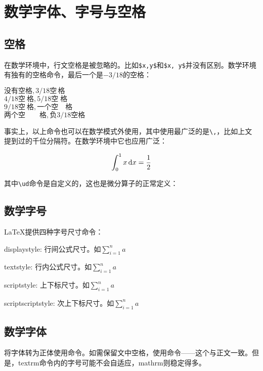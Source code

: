 {\section{数学字体、字号与空格}
\label{sec:mathfont}
\subsection{空格}
在数学环境中，行文空格是被忽略的。比如\verb|$x,y$|和\verb|$x, y$|并没有区别。数学环境有独有的空格命令，最后一个是$-3/18$的空格：

\begin{codeshow}
  $没有空格,3/18空\,格$ \\
  $4/18空\:格,5/18空\;格$ \\
  $9/18空\ 格,一个空\quad 格$ \\
  $两个空\qquad 格,负3/18空\!格$
\end{codeshow}

事实上，以上命令也可以在数学模式外使用，其中使用最广泛的是\verb|\,|，比如上文提到过的千位分隔符。在数学环境中它也应用广泛：

\begin{codeshow}
\[ \int_0^1 x \ud{}x
= \frac{1}{2} \]
\end{codeshow}

其中\verb|\ud|命令是自定义的，这也是微分算子的正常定义\label{cmd:ud}：
\begin{latex}{}
\newcommand{\ud}{\mathop{}\negthinspace\mathrm{d}}
\end{latex}

\subsection{数学字号}
\LaTeX{}提供四种字号尺寸命令：
\begin{para}
\item[\char92 displaystyle:] 行间公式尺寸。如$\displaystyle \sum_{i=1}^n a$
\item[\char92 textstyle:] 行内公式尺寸。如$\textstyle \sum_{i=1}^n a$
\item[\char92 scriptstyle:] 上下标尺寸。如$\scriptstyle \sum_{i=1}^n a$
\item[\char92 scriptscriptstyle:] 次上下标尺寸。如$\scriptscriptstyle \sum_{i=1}^n a$
\end{para}

\subsection{数学字体}
将字体转为正体使用\latexline{\\mathrm}命令。如需保留文中空格，使用\latexline{\\textrm}命令——这个与正文一致。但是，textrm命令内的字号可能不会自适应，mathrm则稳定得多。

}
